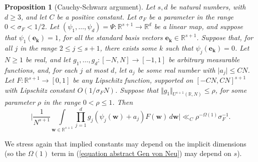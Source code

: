 \documentclass[12pt,a4paper,twoside,reqno]{amsart}
\newtheorem{Proposition}[Theorem]{Proposition}
\numberwithin{equation}{section}
\begin{document}
\begin{Proposition}[Cauchy-Schwarz argument]
\label{Proposition Cauchy}
Let $s,d$ be natural numbers, with $d\geqslant 3$, and let $C$ be a positive constant. Let $\sigma_F$ be a parameter in the range $0 <\sigma_F<1/2$. Let $(\psi_1,\dots,\psi_d) = \Psi:\mathbb{R}^{s+1} \longrightarrow \mathbb{R}^d$ be a linear map, and suppose that $ \psi_1(\mathbf{e_k}) = 1$, for all the standard basis vectors $\mathbf{e_k} \in \mathbb{R}^{s+1}$. Suppose that, for all $j$ in the range $2\leqslant j\leqslant s+1$, there exists some $k$ such that $\psi_j(\mathbf{e_k}) = 0$. Let $N\geqslant 1$ be real, and let $g_1,\dots,g_d:[-N,N]\longrightarrow [-1,1]$ be arbitrary measurable functions, and, for each $j$ at most $d$, let $a_j$ be some real number with $\vert a_j\vert \leqslant CN$. Let $F:\mathbb{R}^{s+1} \longrightarrow [0,1]$ be any Lipschitz function, supported on $[-CN,CN]^{s+1}$ with Lipschitz constant $O(1/\sigma_F N)$. Suppose that $\Vert g_1 \Vert _{U^{s+1}(\mathbb{R},N)} \leqslant \rho$, for some parameter $\rho$ in the range $0<\rho\leqslant 1$. Then 
\begin{equation}
\label{equation abstract Gen von Neu}
\Big\vert\frac{1}{N^{s+1}} \int\limits_{\mathbf{w}\in \mathbb{R}^{s+1}} \prod\limits_{j=1}^d g_j (\psi_j(\mathbf{w}) + a_j)  F(\mathbf{w})\, d\mathbf{w}\Big\vert \ll_C \rho^{-\Omega(1)} \sigma_F^{-1}.
\end{equation}
\end{Proposition}
 \noindent We stress again that implied constants may depend on the implicit dimensions (so the $\Omega(1)$ term in (\ref{equation abstract Gen von Neu}) may depend on $s$). 
\end{document}
